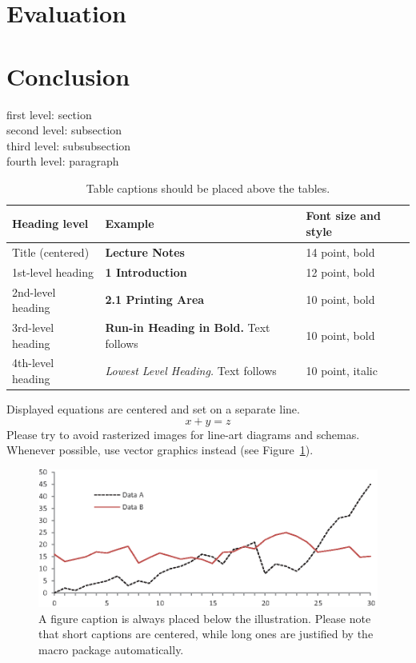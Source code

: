 \section{Evaluation}
\section{Conclusion}




first level: section\\
second level: subsection\\
third level: subsubsection\\
fourth level: paragraph

\begin{table}[tbh!]
\caption{Table captions should be placed above the
tables.}\label{tab1}
\begin{tabular}{lll}
\hline
Heading level &  Example & Font size and style\\
\hline
Title (centered) &  {\Large\bfseries Lecture Notes} & 14 point, bold\\
1st-level heading &  {\large\bfseries 1 Introduction} & 12 point, bold\\
2nd-level heading & {\bfseries 2.1 Printing Area} & 10 point, bold\\
3rd-level heading & {\bfseries Run-in Heading in Bold.} Text follows & 10 point, bold\\
4th-level heading & {\itshape Lowest Level Heading.} Text follows & 10 point, italic\\
\hline
\end{tabular}
\end{table}
Displayed equations are centered and set on a separate line.
\begin{equation}
x + y = z
\end{equation}
Please try to avoid rasterized images for line-art diagrams and
schemas. Whenever possible, use vector graphics instead (see
Figure~\ref{fig1}).

\begin{figure}[tbh!]
\includegraphics[width=\textwidth]{fig1.eps}
\caption{A figure caption is always placed below the illustration.
Please note that short captions are centered, while long ones are
justified by the macro package automatically.} \label{fig1}
\end{figure}
